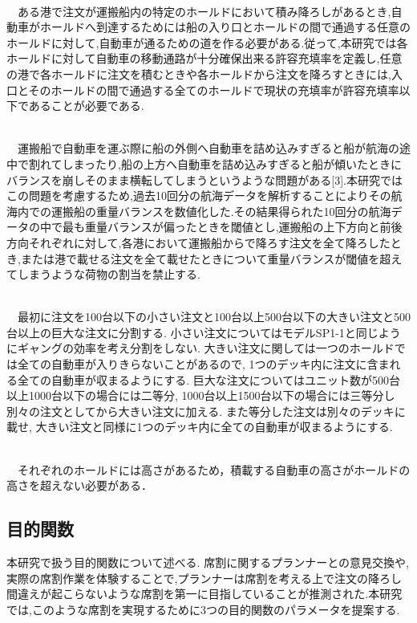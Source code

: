 \documentclass[a4j,11pt,twocolumn]{jsarticle}
\begin{document}
 \\
　ある港で注文が運搬船内の特定のホールドにおいて積み降ろしがあるとき,自動車がホールドへ到達するためには船の入り口とホールドの間で通過する任意のホールドに対して,自動車が通るための道を作る必要がある.従って,本研究では各ホールドに対して自動車の移動通路が十分確保出来る許容充填率を定義し,任意の港で各ホールドに注文を積むときや各ホールドから注文を降ろすときには,入口とそのホールドの間で通過する全てのホールドで現状の充填率が許容充填率以下であることが必要である.

 \\
　運搬船で自動車を運ぶ際に船の外側へ自動車を詰め込みすぎると船が航海の途中で割れてしまったり,船の上方へ自動車を詰め込みすぎると船が傾いたときにバランスを崩しそのまま横転してしまうというような問題がある[3].本研究ではこの問題を考慮するため,過去10回分の航海データを解析することによりその航海内での運搬船の重量バランスを数値化した.その結果得られた10回分の航海データの中で最も重量バランスが偏ったときを閾値とし,運搬船の上下方向と前後方向それぞれに対して,各港において運搬船からで降ろす注文を全て降ろしたとき,または港で載せる注文を全て載せたときについて重量バランスが閾値を超えてしまうような荷物の割当を禁止する.

 \\
　最初に注文を100台以下の小さい注文と100台以上500台以下の大きい注文と500台以上の巨大な注文に分割する. 小さい注文についてはモデルSP1-1と同じようにギャングの効率を考え分割をしない. 大きい注文に関しては一つのホールドでは全ての自動車が入りきらないことがあるので, 1つのデッキ内に注文に含まれる全ての自動車が収まるようにする. 巨大な注文についてはユニット数が500台以上1000台以下の場合には二等分, 1000台以上1500台以下の場合には三等分し別々の注文としてから大きい注文に加える. また等分した注文は別々のデッキに載せ, 大きい注文と同様に1つのデッキ内に全ての自動車が収まるようにする.

 \\
　それぞれのホールドには高さがあるため，積載する自動車の高さがホールドの高さを超えない必要がある．

\subsection{目的関数}
本研究で扱う目的関数について述べる. 席割に関するプランナーとの意見交換や,実際の席割作業を体験することで,プランナーは席割を考える上で注文の降ろし間違えが起こらないような席割を第一に目指していることが推測された.本研究では,このような席割を実現するために3つの目的関数のパラメータを提案する.
\end{document}
